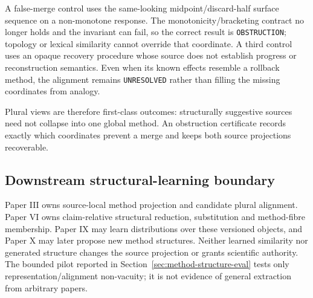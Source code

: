 A false-merge control uses the same-looking midpoint/discard-half surface sequence on a non-monotone response. The monotonicity/bracketing contract no longer holds and the invariant can fail, so the correct result is \texttt{OBSTRUCTION}; topology or lexical similarity cannot override that coordinate. A third control uses an opaque recovery procedure whose source does not establish progress or reconstruction semantics. Even when its known effects resemble a rollback method, the alignment remains \texttt{UNRESOLVED} rather than filling the missing coordinates from analogy.

Plural views are therefore first-class outcomes: structurally suggestive sources need not collapse into one global method. An obstruction certificate records exactly which coordinates prevent a merge and keeps both source projections recoverable.

\subsection{Downstream structural-learning boundary}

Paper III owns source-local method projection and candidate plural alignment. Paper VI owns claim-relative structural reduction, substitution and method-fibre membership. Paper IX may learn distributions over these versioned objects, and Paper X may later propose new method structures. Neither learned similarity nor generated structure changes the source projection or grants scientific authority. The bounded pilot reported in Section~\ref{sec:method-structure-eval} tests only representation/alignment non-vacuity; it is not evidence of general extraction from arbitrary papers.

\endinput
